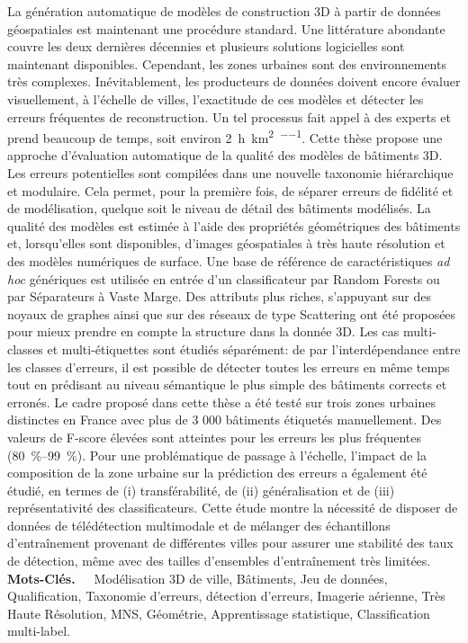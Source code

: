 La génération automatique de modèles de construction 3D à partir de données géospatiales est maintenant une procédure standard.
Une littérature abondante couvre les deux dernières décennies et plusieurs solutions logicielles sont maintenant disponibles.
Cependant, les zones urbaines sont des environnements très complexes.
Inévitablement, les producteurs de données doivent encore évaluer visuellement, à l'échelle de villes, l'exactitude de ces modèles et détecter les erreurs fréquentes de reconstruction.
Un tel processus fait appel à des experts et prend beaucoup de temps, soit environ \SI[per-mode=repeated-symbol]{2}{\hour\per\km\squared\per\expert}.
Cette thèse propose une approche d'évaluation automatique de la qualité des modèles de bâtiments 3D.
Les erreurs potentielles sont compilées dans une nouvelle taxonomie hiérarchique et modulaire.
Cela permet, pour la première fois, de séparer erreurs de fidélité et de modélisation, quelque soit le niveau de détail des bâtiments modélisés.
La qualité des modèles est estimée à l'aide des propriétés géométriques des bâtiments et, lorsqu'elles sont disponibles, d'images géospatiales à très haute résolution et des modèles numériques de surface.
Une base de référence de caractéristiques \textit{ad hoc} génériques est utilisée en entrée d'un classificateur par Random Forests ou par Séparateurs à Vaste Marge.
Des attributs plus riches, s'appuyant sur des noyaux de graphes ainsi que sur des réseaux de type Scattering ont été proposées pour mieux prendre en compte la structure dans la donnée 3D.
Les cas multi-classes et multi-étiquettes sont étudiés séparément: de par l'interdépendance entre les classes d'erreurs, il est possible de détecter toutes les erreurs en même temps tout en prédisant au niveau sémantique le plus simple des bâtiments corrects et erronés.
Le cadre proposé dans cette thèse a été testé sur trois zones urbaines distinctes en France avec plus de 3 000 bâtiments étiquetés manuellement.
Des valeurs de F-score élevées sont atteintes pour les erreurs les plus fréquentes (\SIrange[range-phrase={ -- }]{80}{99}{\percent}).
Pour une problématique de passage à l’échelle, l'impact de la composition de la zone urbaine sur la prédiction des erreurs a également été étudié, en termes de (i) transférabilité, de (ii) généralisation et de (iii) représentativité des classificateurs.
Cette étude montre la nécessité de disposer de données de télédétection multimodale et de mélanger des échantillons d'entraînement provenant de différentes villes pour assurer une stabilité des taux de détection, même avec des tailles d'ensembles d'entraînement très limitées.\\

\textbf{Mots-Clés.}~\ ~Modélisation 3D de ville, Bâtiments, Jeu de données, Qualification, Taxonomie d'erreurs, détection d'erreurs, Imagerie aérienne, Très Haute Résolution, MNS, Géométrie, Apprentissage statistique, Classification multi-label.
